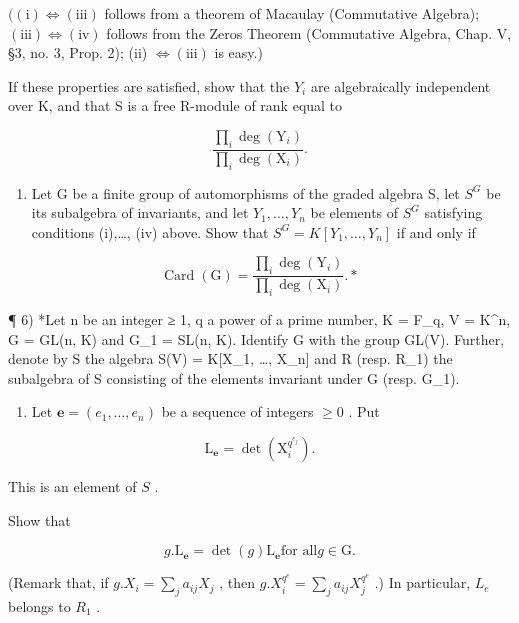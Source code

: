 \(((\mathrm{i}) \Longleftrightarrow (\mathrm{iii})\) follows from a theorem of Macaulay (Commutative Algebra); \((\mathrm{iii}) \Longleftrightarrow (\mathrm{iv})\) follows from the Zeros Theorem (Commutative Algebra, Chap. V, §3, no. 3, Prop. 2); (ii) \(\Longleftrightarrow (\mathrm{iii})\) is easy.)

If these properties are satisfied, show that the \(Y_{i}\) are algebraically independent over K, and that S is a free R-module of rank equal to

\[
\frac {\prod_ {i} \deg (\mathrm{Y} _ {i})}{\prod_ {i} \deg (\mathrm{X} _ {i})}.
\]

\begin{enumerate}
\def\labelenumi{\alph{enumi})}
\setcounter{enumi}{1}
\tightlist
\item
  Let G be a finite group of automorphisms of the graded algebra S, let \(S^{G}\) be its subalgebra of invariants, and let \(Y_{1},\ldots,Y_{n}\) be elements of \(S^{G}\) satisfying conditions (i),\ldots, (iv) above. Show that \(S^{G}=K[Y_{1},\ldots,Y_{n}]\) if and only if
\end{enumerate}

\[
\operatorname{Card} (\mathrm{G}) = \frac {\prod_ {i} \deg \left(\mathrm{Y} _ {i}\right)}{\prod_ {i} \deg \left(\mathrm{X} _ {i}\right)}. *
\]

¶ 6) *Let n be an integer ≥ 1, q a power of a prime number, K = F\_q, V = K\^{}n, G = GL(n, K) and G\_1 = SL(n, K). Identify G with the group GL(V). Further, denote by S the algebra S(V) = K{[}X\_1, \ldots, X\_n{]} and R (resp. R\_1) the subalgebra of S consisting of the elements invariant under G (resp. G\_1).

\begin{enumerate}
\def\labelenumi{\alph{enumi})}
\tightlist
\item
  Let \(\mathbf{e} = (e_1, \ldots, e_n)\) be a sequence of integers \(\geqslant 0\) . Put
\end{enumerate}

\[
\mathrm{L} _ {\mathbf {e}} = \det (\mathrm{X} _ {i} ^ {q ^ {e _ {j}}}).
\]

This is an element of \(S\) .

Show that

\[
g. \mathrm{L} _ {\mathbf {e}} = \det (g) \mathrm{L} _ {\mathbf {e}} \text {for all} g \in \mathrm{G}.
\]

(Remark that, if \(g.X_i = \sum_j a_{ij} X_j\) , then \(g.X_i^{q^e} = \sum_j a_{ij} X_j^{q^e}\) .) In particular, \(L_e\) belongs to \(R_1\) .

